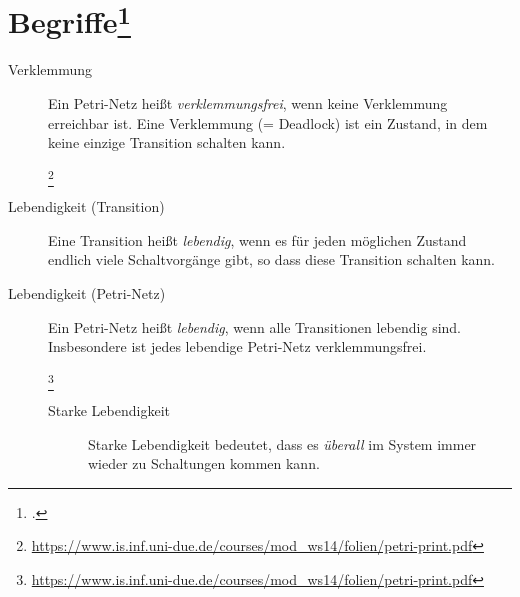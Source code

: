 \documentclass{bschlangaul-theorie}
\begin{document}
%

\section{Begriffe\footcite[Seite 10]{sosy:fs:3}}

\begin{description}
\item[Verklemmung]
Ein Petri-Netz heißt \emph{verklemmungsfrei}, wenn keine Verklemmung
erreichbar ist. Eine Verklemmung (= Deadlock) ist ein Zustand, in dem
keine einzige Transition schalten kann.

\begin{multicols}{2}

\footnote{\url{https://www.is.inf.uni-due.de/courses/mod_ws14/folien/petri-print.pdf}}
\end{multicols}

\item[Lebendigkeit (Transition)]
Eine Transition heißt \emph{lebendig}, wenn es für jeden möglichen
Zustand endlich viele Schaltvorgänge gibt, so dass diese Transition
schalten kann.

\item[Lebendigkeit (Petri-Netz)]
Ein Petri-Netz heißt \emph{lebendig}, wenn alle Transitionen lebendig
sind. Insbesondere ist jedes lebendige Petri-Netz verklemmungsfrei.

\footnote{\url{https://www.is.inf.uni-due.de/courses/mod_ws14/folien/petri-print.pdf}}

\begin{description}
\item[Starke Lebendigkeit]
Starke Lebendigkeit bedeutet, dass es \emph{überall} im System immer
wieder zu Schaltungen kommen kann.


\end{description}
\end{description}
\end{document}
